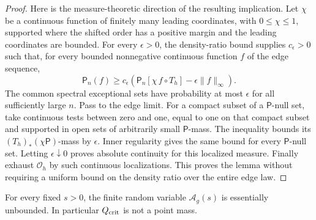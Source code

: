 \begin{proof}
Here is the measure-theoretic direction of the resulting implication.
Let $\chi$ be a continuous function of finitely many leading coordinates,
with $0\leq\chi\leq1$, supported where the shifted order has a positive
margin and the leading coordinates are bounded.  For every
$\epsilon>0$, the density-ratio bound supplies $c_\epsilon>0$ such that,
for every bounded nonnegative continuous function $f$ of the edge
sequence,
\[
 \mathsf P_n(f)\geq c_\epsilon
 \left(\mathsf P_n[\chi\,f\circ T_h]
                       -\epsilon\|f\|_\infty\right).
\]
The common spectral exceptional sets have probability at most
$\epsilon$ for all sufficiently large $n$.  Pass to the edge limit.
For a compact subset of a $\mathsf P$-null set, take continuous tests
between zero and one, equal to one on that compact subset and supported
in open sets of arbitrarily small $\mathsf P$-mass.  The inequality
bounds its $(T_h)_*(\chi\mathsf P)$-mass by $\epsilon$.
Inner regularity gives the same bound for every $\mathsf P$-null set.
Letting $\epsilon\downarrow0$ proves
absolute continuity for this localized measure.  Finally exhaust
$\mathcal O_h$ by such continuous localizations.  This proves the
lemma without requiring a uniform bound on the density ratio over
the entire edge law.
\end{proof}

\begin{proposition}
\label{prop:functional-randomness}
For every fixed $s>0$, the finite random variable $\mathcal A_g(s)$
is essentially unbounded.  In particular $Q_{\rm crit}$ is not a
point mass.
\end{proposition}

